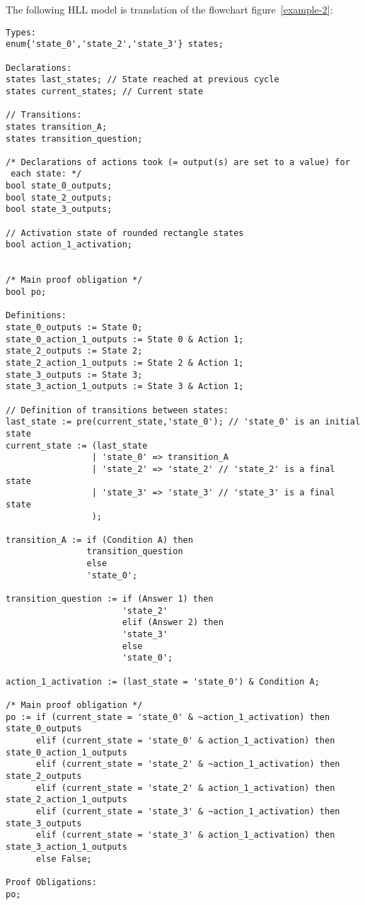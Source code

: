 The following HLL model is translation of the flowchart
figure~\ref{example-2}: 
{\footnotesize
\begin{verbatim}
Types:
enum{'state_0','state_2','state_3'} states;

Declarations:
states last_states; // State reached at previous cycle
states current_states; // Current state

// Transitions:
states transition_A;
states transition_question;

/* Declarations of actions took (= output(s) are set to a value) for
 each state: */
bool state_0_outputs;
bool state_2_outputs;
bool state_3_outputs;

// Activation state of rounded rectangle states
bool action_1_activation;


/* Main proof obligation */
bool po;

Definitions:
state_0_outputs := State 0;
state_0_action_1_outputs := State 0 & Action 1;
state_2_outputs := State 2;
state_2_action_1_outputs := State 2 & Action 1;
state_3_outputs := State 3;
state_3_action_1_outputs := State 3 & Action 1;

// Definition of transitions between states:
last_state := pre(current_state,'state_0'); // 'state_0' is an initial state
current_state := (last_state
                 | 'state_0' => transition_A
                 | 'state_2' => 'state_2' // 'state_2' is a final state
                 | 'state_3' => 'state_3' // 'state_3' is a final state
                 );

transition_A := if (Condition A) then
                transition_question
                else
                'state_0';

transition_question := if (Answer 1) then
                       'state_2'
                       elif (Answer 2) then
                       'state_3'
                       else
                       'state_0';

action_1_activation := (last_state = 'state_0') & Condition A;

/* Main proof obligation */
po := if (current_state = 'state_0' & ~action_1_activation) then state_0_outputs
      elif (current_state = 'state_0' & action_1_activation) then state_0_action_1_outputs
      elif (current_state = 'state_2' & ~action_1_activation) then state_2_outputs
      elif (current_state = 'state_2' & action_1_activation) then state_2_action_1_outputs
      elif (current_state = 'state_3' & ~action_1_activation) then state_3_outputs
      elif (current_state = 'state_3' & action_1_activation) then state_3_action_1_outputs
      else False;

Proof Obligations:
po;
\end{verbatim}
}


